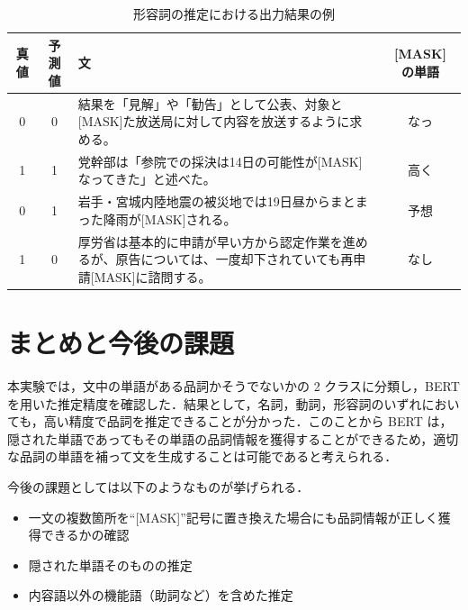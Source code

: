 \documentclass[twocolumn]{jarticle}
\begin{document}
\begin{table}[t]
 \caption{形容詞の推定における出力結果の例}
    \begin{center}
 \begin{tabular}{|c|c|p{30em}|c|} \hline
  真値 & 予測値 & 文 & [MASK] の単語 \\ \hline \hline
  0 & 0 & 結果を「見解」や「勧告」として公表、対象と[MASK]た放送局に対して内容を放送するように求める。 & なっ \\ \hline
  1 & 1 & 党幹部は「参院での採決は14日の可能性が[MASK]なってきた」と述べた。 & 高く  \\ \hline
  0 & 1 & 岩手・宮城内陸地震の被災地では19日昼からまとまった降雨が[MASK]される。 & 予想 \\ \hline
  1 & 0 &	厚労省は基本的に申請が早い方から認定作業を進めるが、原告については、一度却下されていても再申請[MASK]に諮問する。 & なし  \\ \hline
\end{tabular}
    \end{center}
 \label{tb:5}
\end{table}



\section{まとめと今後の課題}
本実験では，文中の単語がある品詞かそうでないかの 2 クラスに分類し，BERT を用いた推定精度を確認した．結果として，名詞，動詞，形容詞のいずれにおいても，高い精度で品詞を推定できることが分かった．このことから BERT は，隠された単語であってもその単語の品詞情報を獲得することができるため，適切な品詞の単語を補って文を生成することは可能であると考えられる．\par
今後の課題としては以下のようなものが挙げられる．
\begin{itemize}
  \item 一文の複数箇所を“[MASK]”記号に置き換えた場合にも品詞情報が正しく獲得できるかの確認
  \item 隠された単語そのものの推定
  \item 内容語以外の機能語（助詞など）を含めた推定
\end{itemize}







\end{document}
